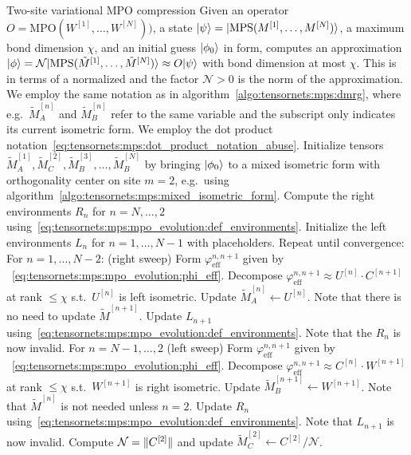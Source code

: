 \begin{Algorithm}{Two-site variational MPO compression}{
    Given an operator $O = \text{MPO}(W^{[1]}, \dots, W^{[N]}))$, a state $\psiket = \ket{\text{MPS}(M^{[1]}, \dots, M^{[N]})}$, a maximum bond dimension $\chi$, and an initial guess $\ket{\phi_0}$ in  form, computes an  approximation $\ket{\phi} = \mathcal{N} \ket{\text{MPS}(\tilde{M}^{[1]}, \dots, \tilde{M}^{[N]})} \approx O\psiket$ with bond dimension at most $\chi$.
    This is in terms of a normalized  and the factor $\mathcal{N} > 0$ is the norm of the approximation.
    We employ the same notation as in algorithm~\ref{algo:tensornets:mps:dmrg}, where e.g.~$\tilde{M}^{[n]}_A$ and $\tilde{M}^{[n]}_B$ refer to the same variable and the subscript only indicates its current isometric form.
    We employ the dot product notation~\eqref{eq:tensornets:mps:dot_product_notation_abuse}.
    \label{algo:tensornets:mps:mpo_evolution_two_site}
}
    \step Initialize  tensors $\tilde{M}_A^{[1]}, \tilde{M}_C^{[2]}, \tilde{M}_B^{[3]}, \dots, \tilde{M}_B^{[N]}$ by bringing $\ket{\phi_0}$ to a mixed isometric form with orthogonality center on site $m=2$, e.g.~using algorithm~\ref{algo:tensornets:mps:mixed_isometric_form}.
    \step Compute the right environments $R_n$ for $n=N,\dots, 2$ using~\eqref{eq:tensornets:mps:mpo_evolution:def_environments}.
    \step Initialize the left environments $L_n$ for $n=1, \dots, N-1$ with placeholders.
    \step Repeat until convergence:
    \step \quad For $n = 1, \dots , N-2$: (right sweep)
    \step \qquad Form $\varphi_\text{eff}^{n,n+1}$ given by ~\eqref{eq:tensornets:mps:mpo_evolution:phi_eff}.
    \step \qquad
    Decompose $\varphi_\text{eff}^{n,n+1} \approx U^{[n]} \cdot C^{[n+1]}$ at rank $\leq \chi$ s.t.~$U^{[n]}$ is left isometric.
    \step \qquad Update $\tilde{M}_A^{[n]} \gets U^{[n]}$. Note that there is no need to update $\tilde{M}^{[n+1]}$.
    \step \qquad Update $L_{n+1}$ using~\eqref{eq:tensornets:mps:mpo_evolution:def_environments}. Note that the $R_n$ is now invalid.
    \step \quad For $n = N - 1, \dots, 2$ (left sweep)
    \step \qquad Form $\varphi_\text{eff}^{n,n+1}$ given by ~\eqref{eq:tensornets:mps:mpo_evolution:phi_eff}.
    \step \qquad
    Decompose $\varphi_\text{eff}^{n,n+1} \approx C^{[n]} \cdot W^{[n+1]}$ at rank $\leq \chi$ s.t.~$W^{[n+1]}$ is right isometric.
    \step \qquad Update $\tilde{M}_B^{[n+1]} \gets W^{[n+1]}$. Note that $\tilde{M}^{[n]}$ is not needed unless $n=2$.
    \step \qquad Update $R_n$ using~\eqref{eq:tensornets:mps:mpo_evolution:def_environments}. Note that $L_{n+1}$ is now invalid.
    \step \quad Compute $\mathcal{N} = \norm{C^{[2]}}$ and update $\tilde{M}_C^{[2]} \gets C^{[2]} / \mathcal{N}$.
\end{Algorithm}



